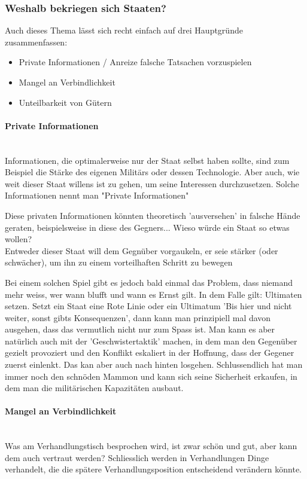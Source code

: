 \documentclass[a4paper, 11pt]{article}
\begin{document}
\subsubsection{Weshalb bekriegen sich Staaten?}
Auch dieses Thema lässt sich recht einfach auf drei Hauptgründe zusammenfassen:

\begin{itemize}
    \item Private Informationen / Anreize falsche Tatsachen vorzuspielen
    \item Mangel an Verbindlichkeit
    \item Unteilbarkeit von Gütern
\end{itemize}

\paragraph{Private Informationen} \mbox{}\\
Informationen, die optimalerweise nur der Staat selbst haben sollte, sind zum Beispiel die Stärke des eigenen Militärs oder dessen Technologie. Aber auch, wie weit dieser Staat willens ist zu gehen, um seine Interessen durchzusetzen. Solche Informationen nennt man "Private Informationen"

\vspace{10px}

Diese privaten Informationen könnten theoretisch 'ausversehen' in falsche Hände geraten, beispielsweise in diese des Gegners... Wieso würde ein Staat so etwas wollen? \\
Entweder dieser Staat will dem Gegnüber vorgaukeln, er seie stärker (oder schwächer), um ihn zu einem vorteilhaften Schritt zu bewegen

Bei einem solchen Spiel gibt es jedoch bald einmal das Problem, dass niemand mehr weiss, wer wann blufft und wann es Ernst gilt. In dem Falle gilt: Ultimaten setzen. Setzt ein Staat eine Rote Linie oder ein Ultimatum 'Bis hier und nicht weiter, sonst gibts Konsequenzen', dann kann man prinzipiell mal davon ausgehen, dass das vermutlich nicht nur zum Spass ist. Man kann es aber natürlich auch mit der 'Geschwistertaktik' machen, in dem man den Gegenüber gezielt provoziert und den Konflikt eskaliert in der Hoffnung, dass der Gegener zuerst einlenkt. Das kan aber auch nach hinten losgehen. Schlussendlich hat man immer noch den schnöden Mammon und kann sich seine Sicherheit erkaufen, in dem man die militärischen Kapazitäten ausbaut.

\paragraph{Mangel an Verbindlichkeit} \mbox{} \\
Was am Verhandlungstisch besprochen wird, ist zwar schön und gut, aber kann dem auch vertraut werden? Schliesslich werden in Verhandlungen Dinge verhandelt, die die spätere Verhandlungsposition entscheidend verändern könnte. 
\end{document}
